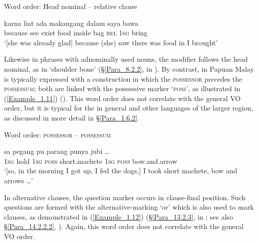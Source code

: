 \begin{styleExampleTitle}
{Word order: Head nominal – relative clause}\label{Word_order_head_nominal}
\end{styleExampleTitle}
\ea
\label{Example_1.10}
\gll {\ldots} {karna} {liat} {ada} {makangang} {dalam} {} {} {saya} {bawa}\\ %
 { }  because see exist food inside bag \textsc{rel} \textsc{1sg} bring\\
\glt 
‘[she was already glad] because (she) saw there was food in  I brought’ \textstyleExampleSource{[080919-004-NP.0032]}
\z


Likewise in  phrases with adnominally used nouns, the modifier  follows the head nominal, as in  ‘shoulder bone’ (§\ref{Para_8.2.2}, in ). By contrast,  in Papuan Malay is typically expressed with a construction in which the \textsc{possessor} precedes the \textsc{possessum}; both are linked with the possessive marker  ‘\textsc{poss}’, as illustrated in (\ref{Example_1.11}) (). This word order does not correlate with the general VO order, but it is typical for the  in general and other  languages of the larger region, as discussed in more detail in §\ref{Para_1.6.2}.

\begin{styleExampleTitle}
Word order: \textsc{possessor} – \textsc{possessum}
\end{styleExampleTitle}
\ea
\label{Example_1.11}
\gll {\ldots} {sa} {pegang} {} {pu} {parang} {} {punya} {jubi} {\ldots}\\ %
 { } \textsc{1sg} hold \textsc{1sg} \textsc{poss} short.machete \textsc{1sg} \textsc{poss} bow.and.arrow  \\

\glt 
‘[so, in the morning I got up, I fed the dogs,] I took  short machete,  bow and arrows \ldots’ \textstyleExampleSource{[080919-003-NP.0003]}
\z


In alternative  clauses, the question marker occurs in clause-final position. Such questions are formed with the alternative-marking   ‘or’ which is also used to mark  clauses, as demonstrated in (\ref{Example_1.12}) (§\ref{Para_13.2.3}, in ; see also §\ref{Para_14.2.2.2}, ). Again, this word order does not correlate with the general VO order.



